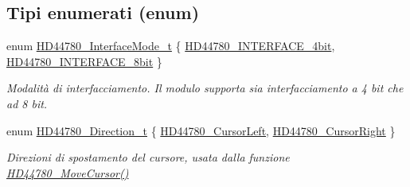 \subsection*{Tipi enumerati (enum)}
\begin{DoxyCompactItemize}
\item 
enum \hyperlink{group___h_d44780_gaaaea8b73e24f7658da4118f6b01b45f0}{H\+D44780\+\_\+\+Interface\+Mode\+\_\+t} \{ \hyperlink{group___h_d44780_ggaaaea8b73e24f7658da4118f6b01b45f0a45bf6ce7ec7c951f692bdce9f0f485c6}{H\+D44780\+\_\+\+I\+N\+T\+E\+R\+F\+A\+C\+E\+\_\+4bit}, 
\hyperlink{group___h_d44780_ggaaaea8b73e24f7658da4118f6b01b45f0a24da9b234f9358c14184fe21f3c47de5}{H\+D44780\+\_\+\+I\+N\+T\+E\+R\+F\+A\+C\+E\+\_\+8bit}
 \}\begin{DoxyCompactList}\small\item\em Modalità di interfacciamento. Il modulo supporta sia interfacciamento a 4 bit che ad 8 bit. \end{DoxyCompactList}
\item 
enum \hyperlink{group___h_d44780_gaf46f4db4f981d3a1088804a6d6980d30}{H\+D44780\+\_\+\+Direction\+\_\+t} \{ \hyperlink{group___h_d44780_ggaf46f4db4f981d3a1088804a6d6980d30aa4d704398d4edd1e0dec8dbb55f90292}{H\+D44780\+\_\+\+Cursor\+Left}, 
\hyperlink{group___h_d44780_ggaf46f4db4f981d3a1088804a6d6980d30a26006ced693b6bab28c6e30bfdb8c399}{H\+D44780\+\_\+\+Cursor\+Right}
 \}\begin{DoxyCompactList}\small\item\em Direzioni di spostamento del cursore, usata dalla funzione \hyperlink{group___h_d44780_gabcea9a03050c46530e39b7556c673baf}{H\+D44780\+\_\+\+Move\+Cursor()} \end{DoxyCompactList}
\end{DoxyCompactItemize}
